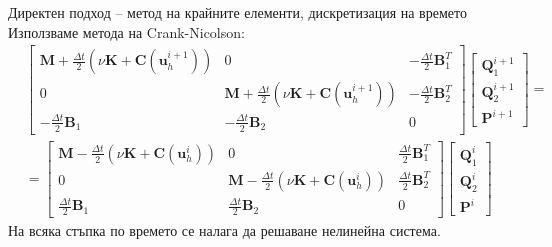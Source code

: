 \documentclass{beamer}
\begin{document}
    \begin{frame}{Директен подход -- метод на крайните елементи, дискретизация на времето}
		Използваме метода на Crank-Nicolson:
		\small
		\begin{align*}
	&\begin{bmatrix}
		\mathbf{M}+\frac{\Delta t}{2}\left(\nu\mathbf{K}+\mathbf{C}(\mathbf{u}_h^{i+1})\right) & 0 & -\frac{\Delta t}{2}\mathbf{B}^T_1 \\
		0 &\mathbf{M}+\frac{\Delta t}{2}\left(\nu\mathbf{K}+\mathbf{C}(\mathbf{u}_h^{i+1})\right) & -\frac{\Delta t}{2}\mathbf{B}^T_2 \\
		-\frac{\Delta t}{2}\mathbf{B}_1 & -\frac{\Delta t}{2}\mathbf{B}_2 & 0
	\end{bmatrix}
	\begin{bmatrix}
		\mathbf{Q}_1^{i+1}\\
		\mathbf{Q}_2^{i+1}\\
		\mathbf{P}^{i+1}
	\end{bmatrix} = \\
	&=\begin{bmatrix}
		\mathbf{M}-\frac{\Delta t}{2}\left(\nu\mathbf{K}+\mathbf{C}(\mathbf{u}_h^{i})\right) & 0 & \frac{\Delta t}{2}\mathbf{B}^T_1 \\
		0 &\mathbf{M}-\frac{\Delta t}{2}\left(\nu\mathbf{K}+\mathbf{C}(\mathbf{u}_h^{i})\right) & \frac{\Delta t}{2}\mathbf{B}^T_2 \\
		\frac{\Delta t}{2}\mathbf{B}_1 & \frac{\Delta t}{2}\mathbf{B}_2 & 0
	\end{bmatrix}
	\begin{bmatrix}
		\mathbf{Q}_1^{i}\\
		\mathbf{Q}_2^{i}\\
		\mathbf{P}^{i}
	\end{bmatrix}
\end{align*}
	На всяка стъпка по времето се налага да решаване нелинейна система.
    \end{frame}
\end{document}
